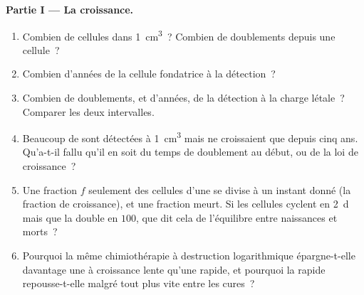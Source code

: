 \begin{problem}
\medskip
\noindent\textbf{Partie I --- La croissance.}
\begin{enumerate}
  \item Combien de cellules dans \qty{1}{cm^3}~? Combien de doublements
        depuis une cellule~?
  \item Combien d'années de la cellule fondatrice à la détection~?
  \item Combien de doublements, et d'années, de la détection à la
        charge létale~? Comparer les deux intervalles.
  \item Beaucoup de  sont détectées à \qty{1}{cm^3} mais ne
        croissaient que depuis cinq ans. Qu'a-t-il fallu qu'il en soit
        du temps de doublement au début, ou de la loi de croissance~?
  \item Une fraction $f$ seulement des cellules d'une  se divise
        à un instant donné (la fraction de croissance), et une fraction
        meurt. Si les cellules cyclent en \qty{2}{d} mais que la 
        double en $100$, que dit cela de l'équilibre entre naissances
        et morts~?
  \item Pourquoi la même chimiothérapie à destruction logarithmique
        épargne-t-elle davantage une  à croissance lente qu'une
         rapide, et pourquoi la rapide repousse-t-elle malgré
        tout plus vite entre les cures~?
\end{enumerate}


\end{problem}
